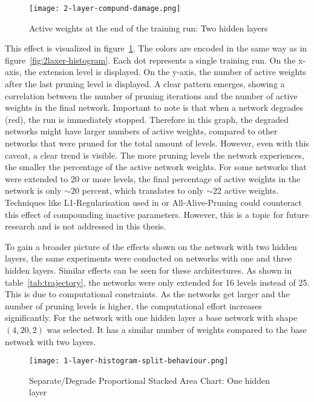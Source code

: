 \begin{figure}[ht] %
    \centering
    \texttt{[image: 2-layer-compund-damage.png]}
    \caption{
        Active weights at the end of the training run: Two hidden layers
    }\label{fig:collateral_damage}
\end{figure}

This effect is visualized in figure~\ref{fig:collateral_damage}.
The colors are encoded in the same way as in figure~\ref{fig:2laxer-histogram}.
Each dot represents a single training run. 
On the x-axis, the extension level is displayed.
On the y-axis, the number of active weights after the last pruning level is displayed.
A clear pattern emerges, showing a correlation between the number of pruning iterations and the number of active weights in the final network.
Important to note is that when a network degrades (red), the run is immediately stopped.
Therefore in this graph, the degraded networks might have larger numbers of active weights, compared to other networks that were pruned for the total amount of levels.
However, even with this caveat, a clear trend is visible.
The more pruning levels the network experiences, the smaller the percentage of the active network weights.
For some networks that were extended to 20 or more levels, the final percentage of active weights in the network is only $\sim20$ percent, which translates to only $\sim22$ active weights.
Techniques like L1-Regularisation used in \autocite{HanEtAl15} or All-Alive-Pruning \autocite{AllAlivePruning} could counteract this effect of compounding inactive parameters.
However, this is a topic for future research and is not addressed in this thesis. 

To gain a broader picture of the effects shown on the network with two hidden layers, the same experiments were conducted on networks with one and three hidden layers.
Similar effects can be seen for these architectures.
As shown in table~\ref{tab:trajectory}, the networks were only extended for 16 levels instead of 25.
This is due to computational constraints. 
As the networks get larger and the number of pruning levels is higher, the computational effort increases significantly.
For the network with one hidden layer a base network with shape $(4,20,2)$ was selected.
It has a similar number of weights compared to the base network with two layers.

\begin{figure}[ht] %
    \centering
    \texttt{[image: 1-layer-histogram-split-behaviour.png]}
    \caption{Separate/Degrade Proportional Stacked Area Chart: One hidden layer
    }\label{fig:1layer-histogram}
\end{figure}

